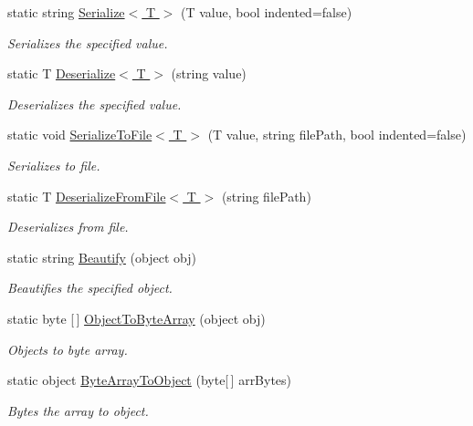 \begin{DoxyCompactItemize}
\item 
static string \hyperlink{class_lerp2_a_p_i_1_1_serializers_1_1_ikillnukes_1_1_x_m_l_tools_afa51b83b4d1475e4a2e0bf8bc26c5569}{Serialize$<$ T $>$} (T value, bool indented=false)
\begin{DoxyCompactList}\small\item\em Serializes the specified value. \end{DoxyCompactList}\item 
static T \hyperlink{class_lerp2_a_p_i_1_1_serializers_1_1_ikillnukes_1_1_x_m_l_tools_a108fbe03d5e7378ad8018b3de077c040}{Deserialize$<$ T $>$} (string value)
\begin{DoxyCompactList}\small\item\em Deserializes the specified value. \end{DoxyCompactList}\item 
static void \hyperlink{class_lerp2_a_p_i_1_1_serializers_1_1_ikillnukes_1_1_x_m_l_tools_a39326a453a18256363333bd8bb20027c}{Serialize\+To\+File$<$ T $>$} (T value, string file\+Path, bool indented=false)
\begin{DoxyCompactList}\small\item\em Serializes to file. \end{DoxyCompactList}\item 
static T \hyperlink{class_lerp2_a_p_i_1_1_serializers_1_1_ikillnukes_1_1_x_m_l_tools_a063504065b7d80b5e7f69d9557c64d6f}{Deserialize\+From\+File$<$ T $>$} (string file\+Path)
\begin{DoxyCompactList}\small\item\em Deserializes from file. \end{DoxyCompactList}\item 
static string \hyperlink{class_lerp2_a_p_i_1_1_serializers_1_1_ikillnukes_1_1_x_m_l_tools_a206e7a447276635f61e93517e2d476fa}{Beautify} (object obj)
\begin{DoxyCompactList}\small\item\em Beautifies the specified object. \end{DoxyCompactList}\item 
static byte \mbox{[}$\,$\mbox{]} \hyperlink{class_lerp2_a_p_i_1_1_serializers_1_1_ikillnukes_1_1_x_m_l_tools_abdef846ad67f78da4456042e2dec3865}{Object\+To\+Byte\+Array} (object obj)
\begin{DoxyCompactList}\small\item\em Objects to byte array. \end{DoxyCompactList}\item 
static object \hyperlink{class_lerp2_a_p_i_1_1_serializers_1_1_ikillnukes_1_1_x_m_l_tools_a71f21ce9684f1b93261716692fd55847}{Byte\+Array\+To\+Object} (byte\mbox{[}$\,$\mbox{]} arr\+Bytes)
\begin{DoxyCompactList}\small\item\em Bytes the array to object. \end{DoxyCompactList}\end{DoxyCompactItemize}


